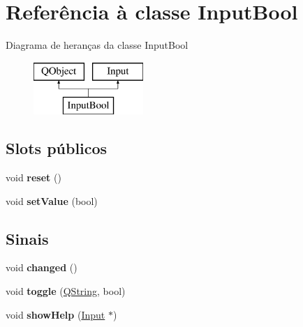 \hypertarget{class_input_bool}{\section{Referência à classe Input\-Bool}
\label{class_input_bool}
}
Diagrama de heranças da classe Input\-Bool\begin{figure}[H]
\begin{center}
\leavevmode
\includegraphics[height=2.000000cm]{class_input_bool}
\end{center}
\end{figure}
\subsection*{Slots públicos}
\begin{DoxyCompactItemize}
\item 
\hypertarget{class_input_bool_ad20897c5c8bd47f5d4005989bead0e55}{void {\bfseries reset} ()}\label{class_input_bool_ad20897c5c8bd47f5d4005989bead0e55}

\item 
\hypertarget{class_input_bool_a21a0b97f6bb68fb2efe4ec33140d9fd5}{void {\bfseries set\-Value} (bool)}\label{class_input_bool_a21a0b97f6bb68fb2efe4ec33140d9fd5}

\end{DoxyCompactItemize}
\subsection*{Sinais}
\begin{DoxyCompactItemize}
\item 
\hypertarget{class_input_bool_a5d42414aede4a6105b6956c0aca81fa0}{void {\bfseries changed} ()}\label{class_input_bool_a5d42414aede4a6105b6956c0aca81fa0}

\item 
\hypertarget{class_input_bool_a5e7e3df500f49c026bf1942462a83dd2}{void {\bfseries toggle} (\hyperlink{class_q_string}{Q\-String}, bool)}\label{class_input_bool_a5e7e3df500f49c026bf1942462a83dd2}

\item 
\hypertarget{class_input_bool_af32333a92f81f1f8570f1ddc0e5443d5}{void {\bfseries show\-Help} (\hyperlink{class_input}{Input} $\ast$)}\label{class_input_bool_af32333a92f81f1f8570f1ddc0e5443d5}

\end{DoxyCompactItemize}
